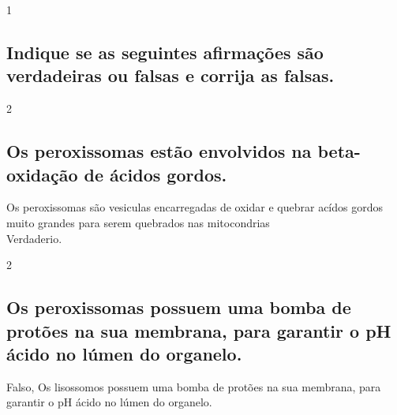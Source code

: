 \documentclass[\mainfilename]{subfiles}
\begin{document}
\begin{questionBox}1{} %
    
    \subsection*{Indique se as seguintes afirmações são verdadeiras ou falsas e corrija as falsas.}

\end{questionBox}

\begin{questionBox}2{} %
    
    \subsection*{Os peroxissomas estão envolvidos na beta-oxidação de ácidos gordos.}

    \begin{answerBox}{} %
        Os peroxissomas são vesiculas encarregadas de oxidar e quebrar acídos gordos muito grandes para serem quebrados nas mitocondrias\\
        
        Verdaderio.
    \end{answerBox}

\end{questionBox}

\begin{questionBox}2{} %
    
    \subsection*{Os peroxissomas possuem uma bomba de protões na sua membrana, para garantir o pH ácido no lúmen do organelo.}

    \begin{answerBox}{} %
        Falso, Os lisossomos possuem uma bomba de protões na sua membrana, para garantir o pH ácido no lúmen do organelo.
    \end{answerBox}

\end{questionBox}
\end{document}
